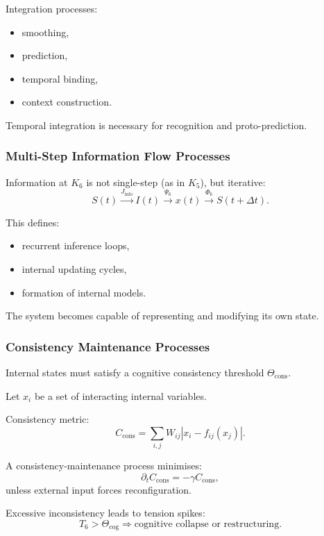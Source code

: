 Integration processes:
\begin{itemize}
    \item smoothing,
    \item prediction,
    \item temporal binding,
    \item context construction.
\end{itemize}

Temporal integration is necessary for recognition and proto-prediction.

\subsubsection{Multi-Step Information Flow Processes}

Information at $K_6$ is not single-step (as in $K_5$), but iterative:
\[
S(t) \xrightarrow{J_{\text{info}}}
I(t) \xrightarrow{\Psi_6}
x(t) \xrightarrow{\Phi_6}
S(t+\Delta t).
\]

This defines:
\begin{itemize}
    \item recurrent inference loops,
    \item internal updating cycles,
    \item formation of internal models.
\end{itemize}

The system becomes capable of representing and modifying its own state.

\subsubsection{Consistency Maintenance Processes}

Internal states must satisfy a cognitive consistency threshold $\Theta_{\text{cons}}$.

Let $x_i$ be a set of interacting internal variables.

Consistency metric:
\[
C_{\text{cons}} = \sum_{i,j} W_{ij} |x_i - f_{ij}(x_j)|.
\]

A consistency-maintenance process minimises:
\[
\partial_t C_{\text{cons}} = -\gamma C_{\text{cons}},
\]
unless external input forces reconfiguration.

Excessive inconsistency leads to tension spikes:
\[
T_6 > \Theta_{\text{cog}}
\Rightarrow \text{cognitive collapse or restructuring}.
\]

